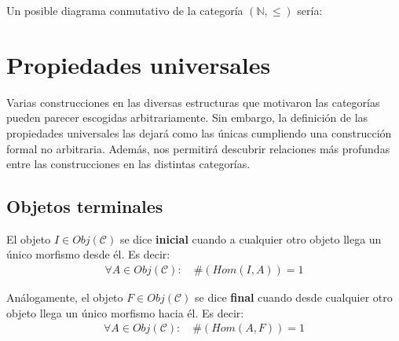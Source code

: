 \documentclass[11pt, fleqn, spanish]{book}
\newcommand{\C}{\mathcal{C} }
\begin{document}
      Un posible diagrama conmutativo de la categoría \texttt{$(\mathbb{N},\leq)$} sería:
      \begin{center}
      \end{center}
 

\chapter{Propiedades universales}
  Varias construcciones en las diversas estructuras que motivaron las categorías pueden parecer
  escogidas arbitrariamente. Sin embargo, la definición de las propiedades universales las dejará
  como las únicas cumpliendo una construcción formal no arbitraria. Además, nos permitirá descubrir
  relaciones más profundas entre las construcciones en las distintas categorías.
  
  \section {Objetos terminales}
    \begin{definition}
      El objeto $I \in Obj(\C)$ se dice \textbf{inicial} cuando a cualquier otro objeto llega
      un único morfismo desde él. Es decir:
      \begin{gather*}
	\forall A \in Obj(\C):\quad \#(Hom(I,A)) = 1
      \end{gather*}
    \end{definition}
 

    \begin{definition}
      Análogamente, el objeto $F \in Obj(\C)$ se dice \textbf{final} cuando desde cualquier otro objeto llega
      un único morfismo hacia él. Es decir:
      \begin{gather*}
	\forall A \in Obj(\C):\quad \#(Hom(A,F)) = 1
      \end{gather*}
    \end{definition}
 
\end{document}
